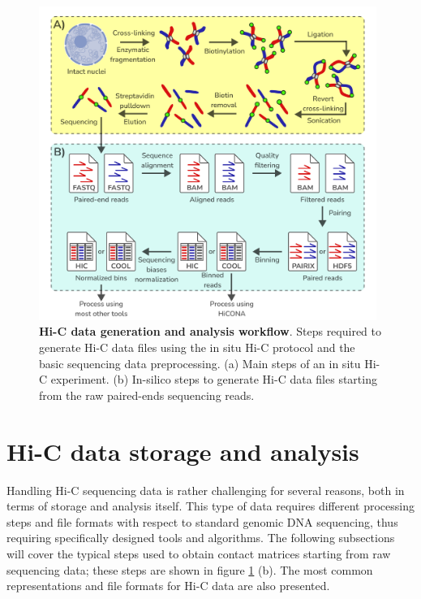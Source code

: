 \begin{figure}[ht]
  \centering
  \includegraphics[width=0.98\textwidth]{hic_pipeline.png}
  \caption{\textbf{Hi-C data generation and analysis workflow}. Steps required to generate Hi-C data files using the in situ Hi-C protocol and the basic sequencing data preprocessing. (a) Main steps of an in situ Hi-C experiment. (b) In-silico steps to generate Hi-C data files starting from the raw paired-ends sequencing reads.}
  \label{fig:pipeline}
\end{figure}

\newpage
\section{Hi-C data storage and analysis}

Handling Hi-C sequencing data is rather challenging for several reasons, both in terms of storage and analysis itself. This type of data requires different processing steps and file formats with respect to standard genomic DNA sequencing, thus requiring specifically designed tools and algorithms. The following subsections will cover the typical steps used to obtain contact matrices starting from raw sequencing data\cite{hicprocessing2018}; these steps are shown in figure \ref{fig:pipeline} (b). The most common representations and file formats for Hi-C data are also presented.


